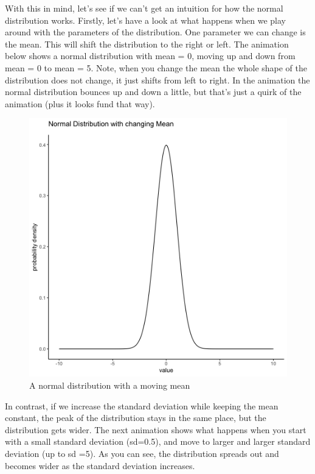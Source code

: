 \documentclass[
]{book}
\begin{document}
With this in mind, let's see if we can't get an intuition for how the normal distribution works. Firstly, let's have a look at what happens when we play around with the parameters of the distribution. One parameter we can change is the mean. This will shift the distribution to the right or left. The animation below shows a normal distribution with mean = 0, moving up and down from mean = 0 to mean = 5. Note, when you change the mean the whole shape of the distribution does not change, it just shifts from left to right. In the animation the normal distribution bounces up and down a little, but that's just a quirk of the animation (plus it looks fund that way).

\begin{figure}
\centering
\includegraphics{gifs/normalMovingMean-1.gif}
\caption{\label{fig:4normalMeanShift}A normal distribution with a moving mean}
\end{figure}

In contrast, if we increase the standard deviation while keeping the mean constant, the peak of the distribution stays in the same place, but the distribution gets wider. The next animation shows what happens when you start with a small standard deviation (sd=0.5), and move to larger and larger standard deviation (up to sd =5). As you can see, the distribution spreads out and becomes wider as the standard deviation increases.
\end{document}
